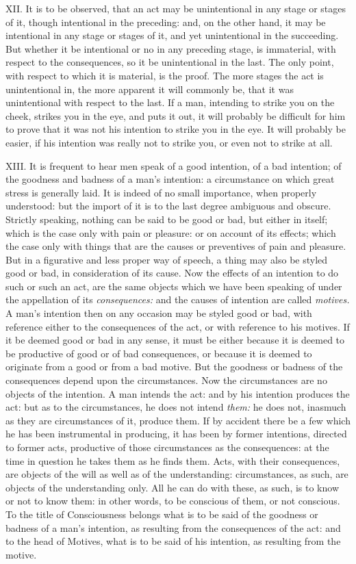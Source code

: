 \documentclass[12pt]{report}
\begin{document}
XII. It is to be observed, that an act may be unintentional in any stage
or stages of it, though intentional in the preceding: and, on the other
hand, it may be intentional in any stage or stages of it, and yet
unintentional in the succeeding. But whether it be intentional or no in
any preceding stage, is immaterial, with respect to the consequences, so
it be unintentional in the last. The only point, with respect to which
it is material, is the proof. The more stages the act is unintentional
in, the more apparent it will commonly be, that it was unintentional
with respect to the last. If a man, intending to strike you on the
cheek, strikes you in the eye, and puts it out, it will probably be
difficult for him to prove that it was not his intention to strike you
in the eye. It will probably be easier, if his intention was really not
to strike you, or even not to strike at all.

XIII. It is frequent to hear men speak of a good intention, of a bad
intention; of the goodness and badness of a man's intention: a
circumstance on which great stress is generally laid. It is indeed of no
small importance, when properly understood: but the import of it is to
the last degree ambiguous and obscure. Strictly speaking, nothing can be
said to be good or bad, but either in itself; which is the case only
with pain or pleasure: or on account of its effects; which the case only
with things that are the causes or preventives of pain and pleasure. But
in a figurative and less proper way of speech, a thing may also be
styled good or bad, in consideration of its cause. Now the effects of an
intention to do such or such an act, are the same objects which we have
been speaking of under the appellation of its \emph{consequences:} and
the causes of intention are called \emph{motives.} A man's intention
then on any occasion may be styled good or bad, with reference either to
the consequences of the act, or with reference to his motives. If it be
deemed good or bad in any sense, it must be either because it is deemed
to be productive of good or of bad consequences, or because it is deemed
to originate from a good or from a bad motive. But the goodness or
badness of the consequences depend upon the circumstances. Now the
circumstances are no objects of the intention. A man intends the act:
and by his intention produces the act: but as to the circumstances, he
does not intend \emph{them:} he does not, inasmuch as they are
circumstances of it, produce them. If by accident there be a few which
he has been instrumental in producing, it has been by former intentions,
directed to former acts, productive of those circumstances as the
consequences: at the time in question he takes them as he finds them.
Acts, with their consequences, are objects of the will as well as of the
understanding: circumstances, as such, are objects of the understanding
only. All he can do with these, as such, is to know or not to know them:
in other words, to be conscious of them, or not conscious. To the title
of Consciousness belongs what is to be said of the goodness or badness
of a man's intention, as resulting from the consequences of the act: and
to the head of Motives, what is to be said of his intention, as
resulting from the motive.
\end{document}

